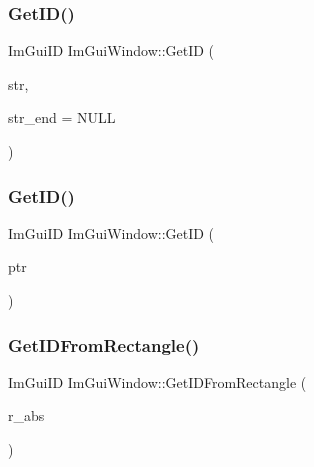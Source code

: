 \subsubsection{\texorpdfstring{Get\+I\+D()}{GetID()}\hspace{0.1cm}{\footnotesize\ttfamily [1/2]}}
{\footnotesize\ttfamily Im\+Gui\+ID Im\+Gui\+Window\+::\+Get\+ID (\begin{DoxyParamCaption}\item[{const char $\ast$}]{str,  }\item[{const char $\ast$}]{str\+\_\+end = {\ttfamily NULL} }\end{DoxyParamCaption})}

\hypertarget{struct_im_gui_window_aae21dffb343cabca9414499b827912a8}{}\label{struct_im_gui_window_aae21dffb343cabca9414499b827912a8} 
\subsubsection{\texorpdfstring{Get\+I\+D()}{GetID()}\hspace{0.1cm}{\footnotesize\ttfamily [2/2]}}
{\footnotesize\ttfamily Im\+Gui\+ID Im\+Gui\+Window\+::\+Get\+ID (\begin{DoxyParamCaption}\item[{const void $\ast$}]{ptr }\end{DoxyParamCaption})}

\hypertarget{struct_im_gui_window_a44931b6e73248930490d2c89377a8233}{}\label{struct_im_gui_window_a44931b6e73248930490d2c89377a8233} 
\subsubsection{\texorpdfstring{Get\+I\+D\+From\+Rectangle()}{GetIDFromRectangle()}}
{\footnotesize\ttfamily Im\+Gui\+ID Im\+Gui\+Window\+::\+Get\+I\+D\+From\+Rectangle (\begin{DoxyParamCaption}\item[{const \hyperlink{struct_im_rect}{Im\+Rect} \&}]{r\+\_\+abs }\end{DoxyParamCaption})}

\hypertarget{struct_im_gui_window_adc0a43f74a0b53a15a4bc4fea05524fe}{}\label{struct_im_gui_window_adc0a43f74a0b53a15a4bc4fea05524fe} 
